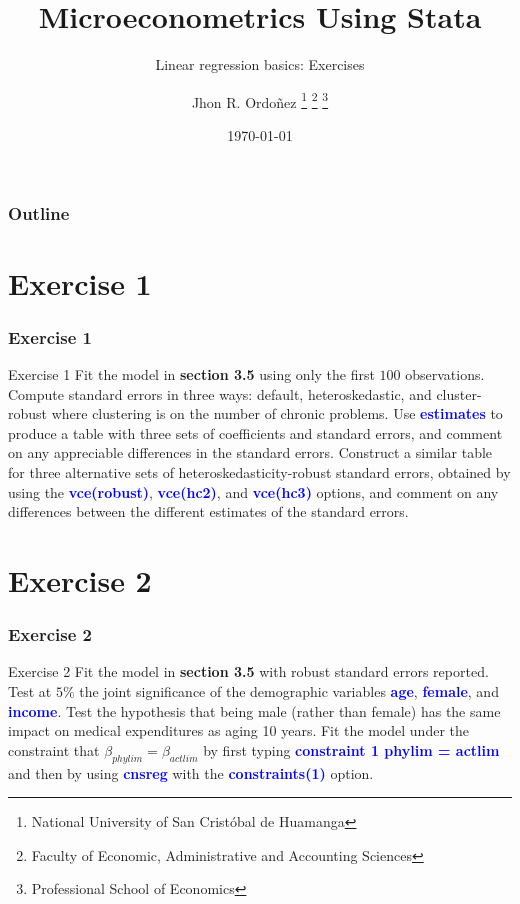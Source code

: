 \documentclass[11pt, aspectratio=169]{beamer}
\title{Microeconometrics Using Stata}
\subtitle{Linear regression basics: Exercises}
\author{
		Jhon R. Ordoñez
		\footnote{\label{1} National University of San Cristóbal de Huamanga}
		\footnote{\label{2} Faculty of Economic, Administrative and Accounting Sciences}
		\footnote{\label{3} Professional School of Economics}
	}
\date{\today}
\begin{document}
	\begin{frame}
		\maketitle
	\end{frame}
	\begin{frame}[t]
		\frametitle{Outline}
		\tableofcontents
	\end{frame}
	\section{Exercise 1}
		\begin{frame}
			\frametitle{Exercise 1}
				\begin{block}{Exercise 1}
					Fit the model in \textcolor{red!50}{\textbf{section 3.5}} using only the first $100$ observations.
					Compute standard errors in three ways: default, heteroskedastic, and
					cluster-robust where clustering is on the number of chronic problems.
					Use \textcolor{blue}{\textbf{estimates}} to produce a table with three sets of coefficients and
					standard errors, and comment on any appreciable differences in the
					standard errors. Construct a similar table for three alternative sets of
					heteroskedasticity-robust standard errors, obtained by using the
					\textcolor{blue}{\textbf{vce(robust)}}, \textcolor{blue}{\textbf{vce(hc2)}}, and \textcolor{blue}{\textbf{vce(hc3)}} options, and comment on any
					differences between the different estimates of the standard errors.
				\end{block}
		\end{frame}
	\section{Exercise 2}
		\begin{frame}
			\frametitle{Exercise 2}
			\begin{block}{Exercise 2}
				Fit the model in \textcolor{red!50}{\textbf{section 3.5}} with robust standard errors reported. Test
				at $5\%$ the joint significance of the demographic variables \textcolor{blue}{\textbf{age}}, \textcolor{blue}{\textbf{female}},
				and \textcolor{blue}{\textbf{income}}. Test the hypothesis that being male (rather than female)
				has the same impact on medical expenditures as aging 10 years. Fit the
				model under the constraint that $\beta_{phylim} = \beta_{actlim}$ by first typing
				\textcolor{blue}{\textbf{constraint 1 phylim = actlim}} and then by using \textcolor{blue}{\textbf{cnsreg}} with the
				\textcolor{blue}{\textbf{constraints(1)}} option.
			\end{block}
		\end{frame}
\end{document}
